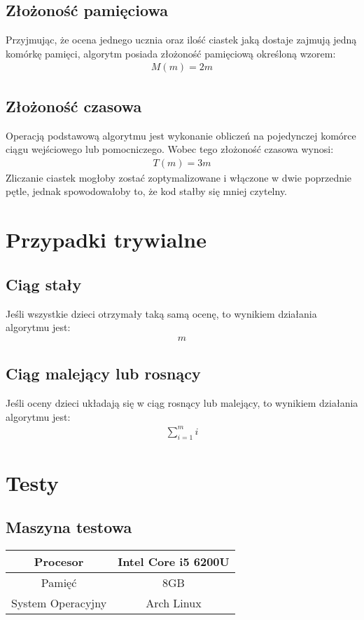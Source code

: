 \documentclass{article}
\begin{document}
	\subsection{Złożoność pamięciowa}
	Przyjmując, że ocena jednego ucznia oraz ilość ciastek jaką dostaje zajmują jedną komórkę pamięci, algorytm posiada złożoność pamięciową określoną wzorem:
	\begin{align*}
		M(m) = 2m
	\end{align*}

	\subsection{Złożoność czasowa}
	Operacją podstawową algorytmu jest wykonanie obliczeń na pojedynczej komórce ciągu wejściowego lub pomocniczego. Wobec tego złożoność czasowa wynosi:
	\begin{align*}
		T(m) = 3m
	\end{align*}
	Zliczanie ciastek mogłoby zostać zoptymalizowane i włączone w dwie poprzednie pętle, jednak spowodowałoby to, że kod stałby się mniej czytelny.


	\section{Przypadki trywialne}

	\subsection{Ciąg stały}

	Jeśli wszystkie dzieci otrzymały taką samą ocenę, to wynikiem działania algorytmu jest:
	\begin{align*}
		m
	\end{align*}

	\subsection{Ciąg malejący lub rosnący}

	Jeśli oceny dzieci układają się w ciąg rosnący lub malejący, to wynikiem działania algorytmu jest:
	\begin{align*}
		\displaystyle\sum_{i=1}^{m} i
	\end{align*}

	\section{Testy}

	\subsection{Maszyna testowa}
	\begin{center}
		\begin{longtable}{c c}
			\toprule
			Procesor & Intel Core i5 6200U \\
			\midrule
			Pamięć & 8GB \\
			\midrule
			System Operacyjny & Arch Linux\\
			\bottomrule
		\end{longtable}
	\end{center}
\end{document}
